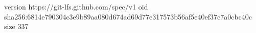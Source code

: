 version https://git-lfs.github.com/spec/v1
oid sha256:6814e790304c3e9b89aa080d674ad69d77e317573b56af5e40ef37c7a0cbc40c
size 337
